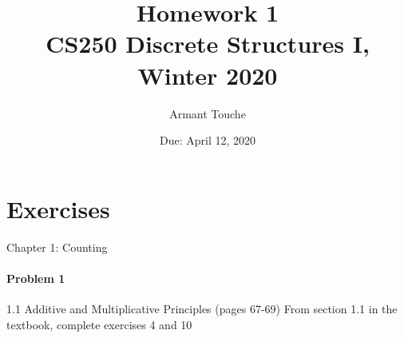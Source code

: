 \documentclass[11pt, a4paper]{article}
\title{\bf Homework 1\\[1ex]
\rm\normalsize CS250 Discrete Structures I, Winter 2020 }
\date{\normalsize Due: April 12, 2020}
\author{\normalsize Armant Touche}
\begin{document}
 
\vspace{0cm}\maketitle 
	\section{Exercises} Chapter 1: Counting\newline
	\paragraph{Problem 1} 1.1 Additive and Multiplicative Principles (pages 67-69)\newline
	From section 1.1 in the textbook, complete exercises 4 and 10
\end{document}
